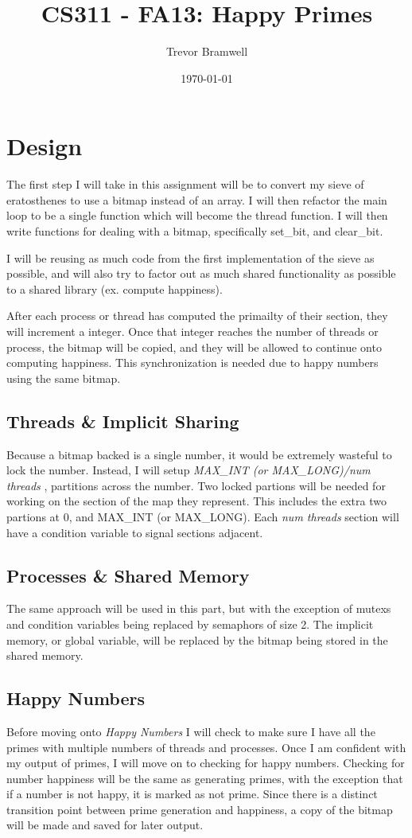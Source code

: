 \documentclass[letterpaper,10pt]{article}
\title{CS311 - FA13: Happy Primes}
\date{\today}
\author{Trevor Bramwell}
\begin{document}
\maketitle

\section{Design}
The first step I will take in this assignment will be to convert my
sieve of eratosthenes to use a bitmap instead of an array. I will then
refactor the main loop to be a single function which will become the
thread function. I will then write functions for dealing with a bitmap,
specifically set\_bit, and clear\_bit.

I will be reusing as much code from the first implementation of the
sieve as possible, and will also try to factor out as much shared
functionality as possible to a shared library (ex. compute happiness).

After each process or thread has computed the primailty of their
section, they will increment a integer. Once that integer reaches the
number of threads or process, the bitmap will be copied, and they will
be allowed to continue onto computing happiness. This synchronization is
needed due to happy numbers using the same bitmap.

\subsection{Threads \& Implicit Sharing}
Because a bitmap backed is a single number, it would be extremely wasteful to
lock the number. Instead, I will setup \emph{MAX\_INT (or MAX\_LONG)/num
threads} , partitions across the number. Two locked partions will be
needed for working on the section of the map they represent. This
includes the extra two partions at 0, and MAX\_INT (or MAX\_LONG). Each
\emph{num threads} section will have a condition variable to signal
sections adjacent.

\subsection{Processes \& Shared Memory}
The same approach will be used in this part, but with the exception of
mutexs and condition variables being replaced by semaphors of size 2.
The implicit memory, or global variable, will be replaced by the bitmap
being stored in the shared memory.

\subsection{Happy Numbers}
Before moving onto \emph{Happy Numbers} I will check to make sure I have
all the primes with multiple numbers of threads and processes. Once I am
confident with my output of primes, I will move on to checking for happy
numbers. Checking for number happiness will be the same as generating
primes, with the exception that if a number is not happy, it is marked
as not prime. Since there is a distinct transition point between prime
generation and happiness, a copy of the bitmap will be made and saved
for later output.
\end{document}
